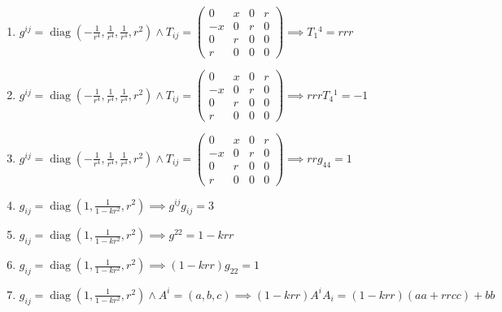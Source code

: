 \documentclass[11pt,a4paper]{article}
\begin{document}
\begin{enumerate}
\item $\displaystyle g^{ij} = \operatorname{diag}(-\frac{1}{r^{4}}, \frac{1}{r^{4}}, \frac{1}{r^{4}}, r^{2}) \land T_{ij} = \begin{pmatrix} 0 & x & 0 & r \\ -x & 0 & r & 0 \\ 0 & r & 0 & 0 \\ r & 0 & 0 & 0 \end{pmatrix} \implies T_{1}{}^{4} = r r r$
\item $\displaystyle g^{ij} = \operatorname{diag}(-\frac{1}{r^{4}}, \frac{1}{r^{4}}, \frac{1}{r^{4}}, r^{2}) \land T_{ij} = \begin{pmatrix} 0 & x & 0 & r \\ -x & 0 & r & 0 \\ 0 & r & 0 & 0 \\ r & 0 & 0 & 0 \end{pmatrix} \implies r r r T_{4}{}^{1} = -1$
\item $\displaystyle g^{ij} = \operatorname{diag}(-\frac{1}{r^{4}}, \frac{1}{r^{4}}, \frac{1}{r^{4}}, r^{2}) \land T_{ij} = \begin{pmatrix} 0 & x & 0 & r \\ -x & 0 & r & 0 \\ 0 & r & 0 & 0 \\ r & 0 & 0 & 0 \end{pmatrix} \implies r r g_{44} = 1$
\item $\displaystyle g_{ij} = \operatorname{diag}(1, \frac{1}{1 - k r^{2}}, r^{2}) \implies g^{ij} g_{ij} = 3$
\item $\displaystyle g_{ij} = \operatorname{diag}(1, \frac{1}{1 - k r^{2}}, r^{2}) \implies g^{22} = 1 - k r r$
\item $\displaystyle g_{ij} = \operatorname{diag}(1, \frac{1}{1 - k r^{2}}, r^{2}) \implies (1 - k r r) g_{22} = 1$
\item $\displaystyle g_{ij} = \operatorname{diag}(1, \frac{1}{1 - k r^{2}}, r^{2}) \land A^{i} = (a, b, c) \implies (1 - k r r) A^{i} A_{i} = (1 - k r r)(a a + r r c c) + b b$
\end{enumerate}
\end{document}
